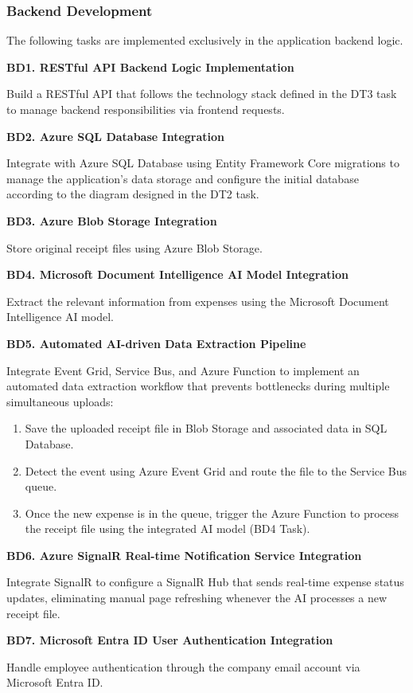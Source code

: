 \subsubsection{Backend Development}

The following tasks are implemented exclusively in the application backend logic.

\textbf{BD1. RESTful API Backend Logic Implementation}

Build a RESTful API that follows the technology stack defined in the DT3 task to manage backend responsibilities via frontend requests. 

\textbf{BD2. Azure SQL Database Integration}

Integrate with Azure SQL Database using Entity Framework Core migrations to manage the application’s data storage and configure the initial database according to the diagram designed in the DT2 task. 

\textbf{BD3. Azure Blob Storage Integration}

Store original receipt files using Azure Blob Storage.

\textbf{BD4. Microsoft Document Intelligence AI Model Integration}

Extract the relevant information from expenses using the Microsoft Document Intelligence AI model. 

\textbf{BD5. Automated AI-driven Data Extraction Pipeline}

Integrate Event Grid, Service Bus, and Azure Function to implement an automated data extraction workflow that prevents bottlenecks during multiple simultaneous uploads:

\begin{enumerate} [leftmargin=0.75cm, noitemsep]
    \item Save the uploaded receipt file in Blob Storage and associated data in SQL Database.
    \item Detect the event using Azure Event Grid and route the file to the Service Bus queue. 
    \item Once the new expense is in the queue, trigger the Azure Function to process the receipt file using the integrated AI model (BD4 Task). 
\end{enumerate}

\textbf{BD6. Azure SignalR Real-time Notification Service Integration}

Integrate SignalR to configure a SignalR Hub that sends real-time expense status updates, eliminating manual page refreshing whenever the AI processes a new receipt file.

\textbf{BD7. Microsoft Entra ID User Authentication Integration}

Handle employee authentication through the company email account via Microsoft Entra ID.


